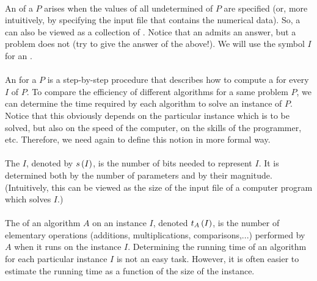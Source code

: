 \paragraph{}
An  of a  $P$ arises when the values of all undetermined  of $P$ are specified (or, more intuitively, by specifying the input file that contains the numerical data). So, a  can also be viewed as a collection of . Notice that an  admits an answer, but a problem does not (try to give the answer of the  above!). We will use the symbol $I$ for an .

\paragraph{}
An  for a  $P$ is a step-by-step procedure that describes how to compute a  for every  $I$ of $P$. To compare the efficiency of different algorithms for a same problem $P$, we can determine the time required by each algorithm to solve an instance of $P$. Notice that this obviously depends on the particular instance which is to be solved, but also on the speed of the computer, on the skills of the programmer, etc. Therefore, we need again to define this notion in more formal way.

\paragraph{}
The  $I$, denoted by $s\left( I \right)$, is the number of bits needed to represent $I$. It is determined both by the number of parameters and by their magnitude. (Intuitively, this can be viewed as the size of the input file of a computer program which solves $I$.)

\paragraph{}
The  of an algorithm $A$ on an instance $I$, denoted $t_A\left( I \right)$, is the number of elementary operations (additions, multiplications, comparisons,...) performed by $A$ when it runs on the instance $I$. Determining the running time of an algorithm for each particular instance $I$ is not an easy task. However, it is often easier to estimate the running time as a function of the size of the instance.

